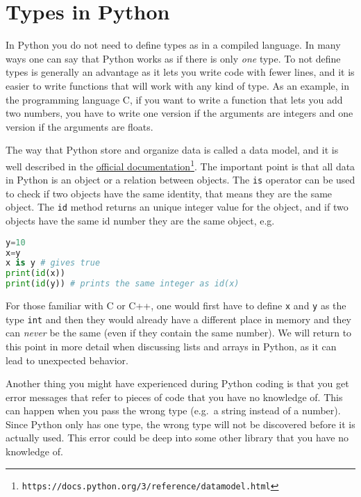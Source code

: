 \documentclass[graybox,sectrefs,envcountresetchap,open=right,final]{svmonodo}
\begin{document}
\section{Types in Python}
In Python you do not need to define types as in a compiled language. In many ways one can say that Python works as if there is only \emph{one} type.  To not define types is generally an advantage as it lets you write code with fewer lines, and it is easier to write functions that will work with any kind of type. As an example, in the programming language C, if you want to write a function that lets you add two numbers, you have to write one version if the arguments are integers and one version if the arguments are floats.

The way that Python store and organize data is called a data model, and it is well described in the \href{{https://docs.python.org/3/reference/datamodel.html}}{official documentation}\footnote{\texttt{https://docs.python.org/3/reference/datamodel.html}}. The important point is that all data in Python is an object or a relation between objects. The \texttt{is} operator can be used to check if two objects have the same identity, that means they are the same object. The \texttt{id} method returns an unique integer value for the object, and if two objects have the same id number they are the same object, e.g.






\begin{lstlisting}[language=python,style=blue1bar]
y=10
x=y
x is y # gives true
print(id(x))
print(id(y)) # prints the same integer as id(x)

\end{lstlisting}

For those familiar with C or C++, one would first have to define \texttt{x} and \texttt{y} as the type \texttt{int} and then they would already have a different place in memory and they can \emph{never} be the same (even if they contain the same number). We will return to this point in more detail when discussing lists and arrays in Python, as it can lead to unexpected behavior.

Another thing you might have experienced during Python coding is that you get error messages that refer to pieces of code that you have no knowledge of. This can happen when you pass the wrong type (e.g.~a string instead of a number). Since Python only has one type, the wrong type will not be discovered before it is actually used. This error could be deep into some other library that you have no knowledge of. 
\end{document}

